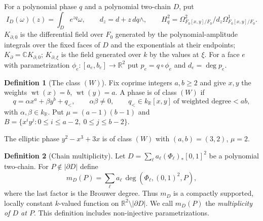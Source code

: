 \documentclass[11pt]{article}
\numberwithin{equation}{section}
\theoremstyle{definition}
\newtheorem{definition}[definition]{Definition}
\theoremstyle{remark}
\newcommand{\C}{\mathbb C}
\newcommand{\R}{\mathbb R}
\newcommand{\Hq}{H_q^2}
\newcommand{\wt}{\operatorname{wt}}
\begin{document}
For a polynomial phase $q$ and a polynomial two-chain $D$, put
\[
 I_D(\omega)(z)=\int_D e^{zq}\omega,\qquad d_z=d+z\,dq\wedge,\qquad
 \Hq=\Omega^2_{F_0[x,y]/F_0}/d_z\Omega^1_{F_0[x,y]/F_0}.
\]
$K_{\partial,0}$ is the differential field over $F_0$ generated by the
polynomial-amplitude integrals over the fixed faces of $D$ and the
exponentials at their endpoints; $K_\partial=\C K_{\partial,0}$;
$K_{\partial,\xi}$ is the field generated over $k$ by the values at $\xi$.
For a face $e$ with parametrization
$\phi_e:[a_e,b_e]\to\R^2$ put $p_e=q\circ\phi_e$ and
$d_e=\deg p_e$.

\begin{definition}[The class $(W)$]\label{def:W}
Fix coprime integers $a,b\ge2$ and give $x,y$ the weights $\wt(x)=b$,
$\wt(y)=a$. A phase is of class $(W)$ if
\[
 q=\alpha x^a+\beta y^b+q_<,\qquad \alpha\beta\ne0,\qquad
 q_<\in k_\R[x,y]\ \text{of weighted degree}<ab,
\]
with $\alpha,\beta\in k_\R$. Put $\mu=(a-1)(b-1)$ and
$B=\{x^iy^j:0\le i\le a-2,\ 0\le j\le b-2\}$.
\end{definition}

The elliptic phase $y^2-x^3+3x$ is of class $(W)$ with $(a,b)=(3,2)$, $\mu=2$.

\begin{definition}[Chain multiplicity]\label{def:chain-multiplicity}
Let $D=\sum_\ell a_\ell(\Phi_\ell)_*[0,1]^2$ be a polynomial
two-chain.  For $P\notin|\partial D|$ define
\[
 m_D(P)=\sum_\ell a_\ell\,
 \deg(\Phi_\ell,(0,1)^2,P),
\]
where the last factor is the Brouwer degree.  Thus $m_D$ is a compactly
supported, locally constant $k$-valued function on
$\R^2\setminus|\partial D|$.  We call $m_D(P)$ the
\emph{multiplicity of $D$ at $P$}.  This definition includes
non-injective parametrizations.
\end{definition}
\end{document}
